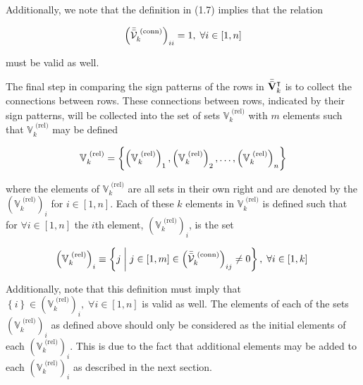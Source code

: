 \documentclass[../../ClusteringConnectionsMAIN.tex]{subfiles}
\begin{document}
\begin{flushleft}
\begin{large}
Additionally, we note that the definition in (1.7) implies that the relation

\begin{align*}
\left( \bar{\bar{\mathbf{\mathcal{V}}}}_k^\text{ (conn)} \right)_{ii} = 1, \; \forall i \in \left[ 1, n \right]
\end{align*}

must be valid as well. \newline


The final step in comparing the sign patterns of the rows in $\bar{\bar{\mathbf{V}}}_k^\intercal$ is to collect the connections between rows.  These connections between rows, indicated by their sign patterns, will be collected into the set of sets $\mathbb{V}_k^\text{ (rel)}$ with $m$ elements such that $\mathbb{V}_k^\text{ (rel)}$ may be defined

\begin{align}
\mathbb{V}_k^\text{ (rel)} = \biggl\{ \left(\mathbb{V}_k^\text{ (rel)}\right)_1, \left(\mathbb{V}_k^\text{ (rel)}\right)_2, \dots, \left(\mathbb{V}_k^\text{ (rel)}\right)_n \biggr\}  \notag
\end{align}

where the elements of $\mathbb{V}_k^\text{ (rel)}$ are all sets in their own right and are denoted by the $\left( \mathbb{V}_k^\text{ (rel)} \right)_i$ for $i \in \left[ 1, n \right]$.  Each of these $k$ elements in $\mathbb{V}_k^\text{ (rel)}$ is defined such that for $\forall i \in \left[ 1, n \right]$ the $i$th element, $\left( \mathbb{V}_k^\text{ (rel)} \right)_i$, is the set 

\begin{align}
\left( \mathbb{V}_k^\text{ (rel)} \right)_i \equiv \left\{ j \; \biggl| \biggr. \; j \in \left[ 1, m \right] \in \left( \bar{\bar{\mathbf{\mathcal{V}}}}_k^\text{ (conn)} \right)_{ij} \neq 0 \right\}, \; \forall i \in \left[ 1, k \right] \; 
\end{align}

Additionally, note that this definition must imply that $\left\{ i \right\} \in \left( \mathbb{V}_k^\text{ (rel)} \right)_i, \; \forall i \in \left[ 1, n \right]$ is valid as well.  The elements of each of the sets $\left( \mathbb{V}_k^\text{ (rel)} \right)_i$ as defined above should only be considered as the initial elements of each $\left( \mathbb{V}_k^\text{ (rel)} \right)_i$.  This is due to the fact that additional elements may be added to each $\left( \mathbb{V}_k^\text{ (rel)} \right)_i$ as described in the next section.


\end{large}
\end{flushleft}
\end{document}
